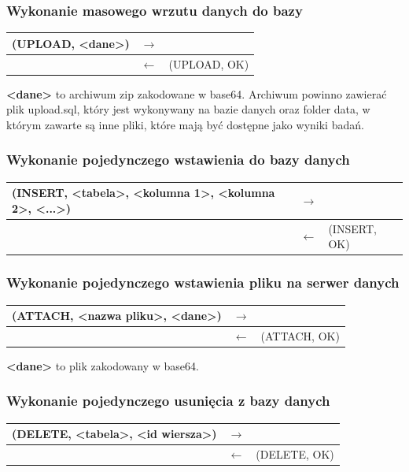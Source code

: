 \subsubsection{Wykonanie masowego wrzutu danych do bazy}

\begin{longtable}{| p{} | p{}| p{} |} 
\hline
(UPLOAD, <dane>) & $\rightarrow$ &  \\ \hline
 & $\leftarrow$ & (UPLOAD, OK) \\ \hline
\end{longtable}

\textbf{<dane>} to archiwum zip zakodowane w base64. Archiwum powinno zawierać plik upload.sql, który jest wykonywany na bazie danych oraz folder data, w którym zawarte są inne pliki, które mają być dostępne jako wyniki badań.

\subsubsection{Wykonanie pojedynczego wstawienia do bazy danych}

\begin{longtable}{| p{} | p{}| p{} |} 
\hline
(INSERT, <tabela>, <kolumna 1>, <kolumna 2>, <...>) & $\rightarrow$ &  \\ \hline
 & $\leftarrow$ & (INSERT, OK) \\ \hline
\end{longtable}

\subsubsection{Wykonanie pojedynczego wstawienia pliku na serwer danych}

\begin{longtable}{| p{} | p{}| p{} |} 
\hline
(ATTACH, <nazwa pliku>, <dane>) & $\rightarrow$ &  \\ \hline
 & $\leftarrow$ & (ATTACH, OK) \\ \hline
\end{longtable}
\textbf{<dane>} to plik zakodowany w base64.

\subsubsection{Wykonanie pojedynczego usunięcia z bazy danych}

\begin{longtable}{| p{} | p{}| p{} |} 
\hline
(DELETE, <tabela>, <id wiersza>) & $\rightarrow$ &  \\ \hline
 & $\leftarrow$ & (DELETE, OK) \\ \hline
\end{longtable}

